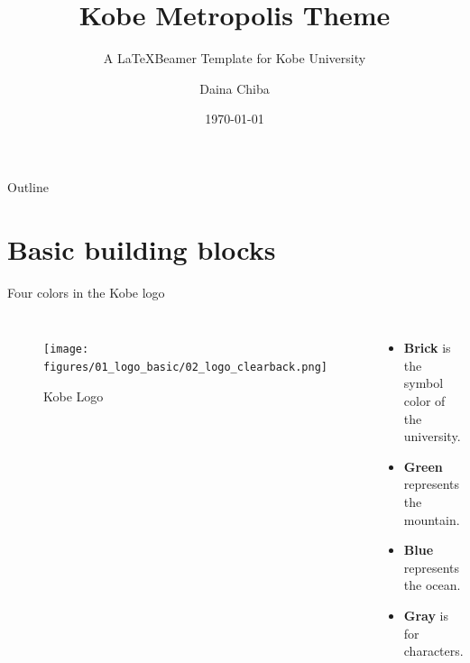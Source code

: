 \documentclass[12pt]{beamer}
\title{Kobe Metropolis Theme}
\subtitle{A \LaTeX \space Beamer Template for Kobe University}
\date{\today}
\author{Daina Chiba}
\institute{Kobe University}
\begin{document}
\maketitle %
\begin{frame}[plain]{Outline} %
	\tableofcontents
\end{frame}



\section{Basic building blocks}


\begin{frame}{Four colors in the Kobe logo}
\begin{columns}
    	\begin{figure}
        \centering
        \texttt{[image: figures/01\_logo\_basic/02\_logo\_clearback.png]}
        \caption{Kobe Logo}
        \end{figure}
        \begin{itemize}
        \item {\color{kobebrick}\bf Brick} is the symbol color of the university.
        \item {\color{kobegreen}\bf Green} represents the mountain.
        \item {\color{kobeblue}\bf Blue} represents the ocean.
		\item {\color{kobegray}\bf Gray} is for characters.
        \end{itemize}
	\end{columns} 
\end{frame}
\end{document}
